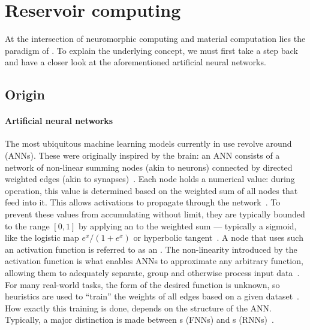 \newpage
\section{Reservoir computing}\label{sec:1:RC}
At the intersection of neuromorphic computing and material computation lies the paradigm of .
To explain the underlying concept, we must first take a step back and have a closer look at the aforementioned artificial neural networks.

\subsection{Origin}
\paragraph{Artificial neural networks}
The most ubiquitous machine learning models currently in use revolve around  (ANNs).
These were originally inspired by the brain: an ANN consists of a network of non-linear summing nodes (akin to neurons) connected by directed weighted edges (akin to synapses)~\cite{EvaluatingRestrictedESNs,zurada1992introduction,AIsimulateMemoryContinuity}.
Each node holds a numerical value: during operation, this value is determined based on the weighted sum of all nodes that feed into it.
This allows activations to propagate through the network~\cite{lukovsevivcius2009reservoir}.
To prevent these values from accumulating without limit, they are typically bounded to the range $[0,1]$ by applying an  to the weighted sum --- typically a sigmoid, like the logistic map $e^x/(1+e^x)$ or hyperbolic tangent~\cite{SurveyUniversalApproximation}.
A node that uses such an activation function is referred to as an .
The non-linearity introduced by the activation function is what enables ANNs to approximate any arbitrary function, allowing them to adequately separate, group and otherwise process input data~\cite{ApproximationFNN,SurveyUniversalApproximation,funahashi1992neural}.
For many real-world tasks, the form of the desired function is unknown, so heuristics are used to ``train'' the weights of all edges based on a given dataset~\cite{EvaluatingRestrictedESNs}.
How exactly this training is done, depends on the structure of the ANN.
Typically, a major distinction is made between s (FNNs) and s (RNNs)~\cite{ApproximationRNN}. \par
